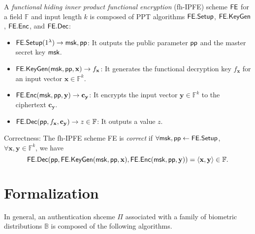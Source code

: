 \begin{definition}
\label{def:fh-IPFE}
	A \emph{functional hiding inner product functional encryption} (fh-IPFE) scheme $\sf FE$ for a field $\mathbb{F}$ and input length $k$ is composed of PPT algorithms ${\sf FE.Setup}$, ${\sf FE.KeyGen}$, ${\sf FE.Enc}$, and ${\sf FE.Dec}$:

\begin{itemize}

	\item ${\sf FE.Setup}(1^\lambda) \to {\sf msk}, {\sf pp}$: It outputs the public parameter ${\sf pp}$ and the master secret key ${\sf msk}$.

	\item ${\sf FE.KeyGen}({\sf msk}, {\sf pp}, \mathbf{x}) \to f_\mathbf{x}$: It generates the functional decryption key $f_\mathbf{x}$ for an input vector $\mathbf{x} \in \mathbb{F}^k$. 

	\item ${\sf FE.Enc}({\sf msk}, {\sf pp}, \mathbf{y}) \to \mathbf{c_y}$: It encrypts the input vector $\mathbf{y} \in \mathbb{F}^k$ to the ciphertext $\mathbf{c_y}$. 

	\item ${\sf FE.Dec}({\sf pp}, f_\mathbf{x}, \mathbf{c_y}) \to z \in \mathbb{F}$: It outputs a value $z$.

\end{itemize}

\noindent Correctness: The fh-IPFE scheme {\sf FE} is \emph{correct} if $\forall {\sf msk}, {\sf pp} \gets {\sf FE.Setup}$, $\forall \mathbf{x}, \mathbf{y} \in \mathbb{F}^k$, we have
	\[
		{\sf FE.Dec}( {\sf pp}, {\sf FE.KeyGen}({\sf msk}, {\sf pp}, \mathbf{x}), {\sf FE.Enc}({\sf msk}, {\sf pp}, \mathbf{y}) ) = \langle \mathbf{x} , \mathbf{y} \rangle \in \mathbb{F}.
	\]

\end{definition}


\section{Formalization}
\label{sec:formalization}


In general, an authentication shceme $\Pi$ associated with a family of biometric distributions $\mathbb{B}$ is composed of the following algorithms.

